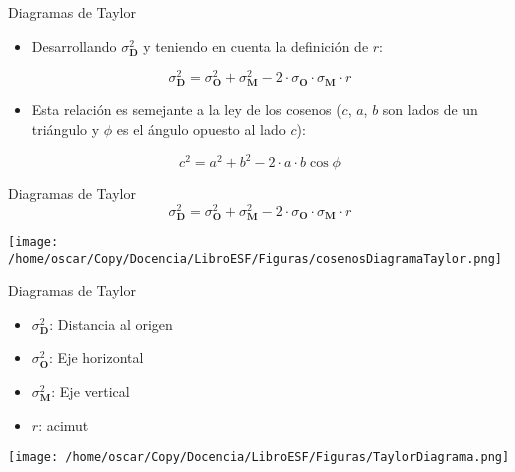 \documentclass[xcolor={usenames,svgnames,dvipsnames}]{beamer}
\let\cite\parencite
\begin{document}
\begin{frame}[label=sec-4-7]{Diagramas de Taylor}
\begin{itemize}
\item Desarrollando $\sigma^2_{\mathbf{D}}$ y teniendo en cuenta la definición de $r$:
\end{itemize}

  \[
  \sigma^2_{\mathbf{D}} = \sigma^2_{\mathbf{O}}  + \sigma^2_{\mathbf{M}}
- 2 \cdot \sigma_{\mathbf{O}} \cdot \sigma_{\mathbf{M}} \cdot r
  \]
\begin{itemize}
\item Esta relación es semejante a la ley de los cosenos ($c$, $a$, $b$ son lados de un triángulo y $\phi$ es el ángulo opuesto al lado $c$):
\end{itemize}

\[
c^2 = a^2 + b^2 - 2 \cdot a \cdot b \cos\phi
\]
\cite{Taylor2000}
\end{frame}
\begin{frame}[label=sec-4-8]{Diagramas de Taylor}
\[
\sigma^2_{\mathbf{D}} = \sigma^2_{\mathbf{O}}  + \sigma^2_{\mathbf{M}}
- 2 \cdot \sigma_{\mathbf{O}} \cdot \sigma_{\mathbf{M}} \cdot r 
\]

\begin{center}
\texttt{[image: /home/oscar/Copy/Docencia/LibroESF/Figuras/cosenosDiagramaTaylor.png]}
\end{center}
\end{frame}
\begin{frame}[label=sec-4-9]{Diagramas de Taylor}
\begin{itemize}
\item $\sigma^2_{\mathbf{D}}$: Distancia al origen
\item $\sigma^2_{\mathbf{O}}$: Eje horizontal
\item $\sigma^2_{\mathbf{M}}$: Eje vertical
\item $r$: acimut
\end{itemize}
\begin{center}
\texttt{[image: /home/oscar/Copy/Docencia/LibroESF/Figuras/TaylorDiagrama.png]}
\end{center}
\end{frame}
\end{document}
